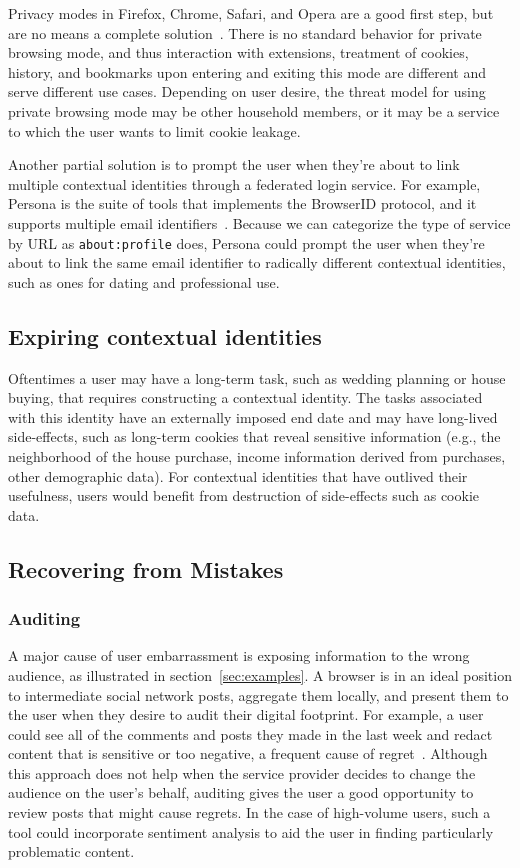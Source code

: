 \documentclass[10pt, conference, compsocconf]{IEEEtran}
\begin{document}
Privacy modes in Firefox, Chrome, Safari, and Opera are a good first step, but
are no means a complete solution~\cite{ABBJ10}. There is no standard behavior
for private browsing mode, and thus interaction with extensions, treatment of
cookies, history, and bookmarks upon entering and exiting this mode are
different and serve different use cases. Depending on user desire, the threat
model for using private browsing mode may be other household members, or it may
be a service to which the user wants to limit cookie leakage.

Another partial solution is to prompt the user when they're about to link
multiple contextual identities through a federated login service. For example,
Persona is the suite of tools that implements the BrowserID protocol, and it
supports multiple email identifiers~\cite{browserid}.
Because we can categorize the type of service by URL
as \texttt{about:profile} does, Persona could prompt the user when they're about
to link the same email identifier to radically different contextual identities,
such as ones for dating and professional use.

\subsection{Expiring contextual identities}
Oftentimes a user may have a long-term task, such as wedding planning or house
buying, that requires constructing a contextual identity. The tasks associated
with this identity have an externally imposed end date and may have long-lived
side-effects, such as long-term cookies that reveal sensitive information
(e.g., the neighborhood of the house purchase, income information derived from
purchases, other demographic data). For contextual identities that have
outlived their usefulness, users would benefit from destruction of side-effects
such as cookie data.

\subsection{Recovering from Mistakes}
\subsubsection{Auditing}
A major cause of user embarrassment is exposing information to the wrong
audience, as illustrated in section~\ref{sec:examples}. A browser is in an
ideal position to intermediate social network posts, aggregate them locally,
and present them to the user when they desire to audit their digital footprint.
For example, a user could see all of the comments and posts they made in the
last week and redact content that is sensitive or too negative, a frequent cause
of regret~\cite{wang}.  Although this approach does not help when the service
provider decides to change the audience on the user's behalf, auditing gives
the user a good opportunity to review posts that might cause regrets. In the
case of high-volume users, such a tool could incorporate sentiment analysis to
aid the user in finding particularly problematic content.
\end{document}
